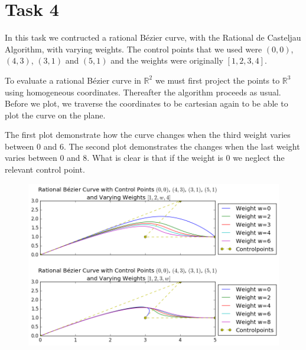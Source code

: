 \documentclass[]{article}
\begin{document}
\newpage
\section*{Task 4}
In this task we contructed a rational Bézier curve, with the Rational de Casteljau Algorithm, with varying weights. The control points that we used were $(0,0)$, $(4,3)$, $(3,1)$ and $(5,1)$ and the weights were originally $[1,2,3,4]$. 

To evaluate a rational Bézier curve in $\mathbb{R}^2$ we must first project the points to $\mathbb{R}^3$ using homogeneous coordinates. Thereafter the algorithm proceeds as usual. Before we plot, we traverse the coordinates to be cartesian again to be able to plot the curve on the plane. 

The first plot demonstrate how the curve changes when the third weight varies between $0$ and $6$. The second plot demonstrates the changes when the last weight varies between $0$ and $8$. What is clear is that if the weight is $0$ we neglect the relevant control point.

\begin{figure}[h!]
	\includegraphics[scale=0.5]{task4}
\end{figure}
\end{document}
